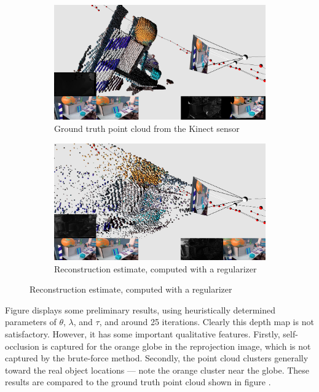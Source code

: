 \documentclass[conference]{IEEEtran}
\begin{document}
\begin{figure}[htbp]
\begin{subfigure}[b]{0.5\textwidth}
\centerline{\includegraphics[width=\textwidth]{figures/cloud_groundtruth.png}}
\caption{Ground truth point cloud from the Kinect sensor}
\label{cloud_groundtruth}
\end{subfigure}
\begin{subfigure}[b]{0.5\textwidth}
\centerline{\includegraphics[width=\textwidth]{figures/cloud_computed.png}}
\caption{Reconstruction estimate, computed with a regularizer}
\label{cloud_computed}
\end{subfigure}
\end{figure}


Figure \cite{cloud_computed} displays some preliminary results, using heuristically determined parameters of $\theta$, $\lambda$, and $\tau$, and around 25 iterations.
Clearly this depth map is not satisfactory. However, it has some important qualitative features. Firstly, self-occlusion is captured for the
orange globe in the reprojection image, which is not captured by the brute-force method. Secondly, the point cloud clusters generally
toward the real object locations --- note the orange cluster near the globe. These results are compared to the ground truth point cloud shown
in figure \cite{cloud_groundtruth}.
\end{document}
